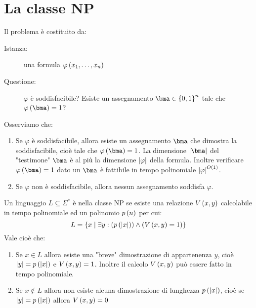 \documentclass{lectures}
\begin{document}
\chapter{La classe NP}
\begin{multicols}{2}
\begin{definition}[SODD]
    Il problema è costituito da:
    \begin{description}
        \item[Istanza:] una formula \(\varphi\left(x_1, \ldots, x_n\right)\)
        \item[Questione:] \(\varphi\) è soddisfacibile? Esiste un assegnamento \(\bma \in \crl{0,1}^n\) tale che \(\varphi\rnd{\bma} = 1\)?
    \end{description}
    Osserviamo che:
    \begin{enumerate}
        \item Se \(\varphi\) è soddisfacibile, allora esiste un assegnamento \(\bma\) che dimostra la soddisfacibile, cioè tale che \(\varphi\rnd{\bma} = 1\). La dimensione \(\abs{\bma}\) del "testimone" \(\bma\) è al più la dimensione \(\left\lvert\varphi\right\rvert\) della formula. Inoltre verificare \(\varphi\rnd{\bma} = 1\) dato un \(\bma\) è fattibile in tempo polinomiale \(\left\lvert\varphi\right\rvert^{O\left(1\right)}\).
        \item Se \(\varphi\) non è soddisfacibile, allora nessun assegnamento soddisfa \(\varphi\).
    \end{enumerate}
\end{definition}
\begin{definition}[Problema NP]
    Un linguaggio \(L\subseteq \Sigma^*\) è nella classe NP se esiste una relazione \(V\left(x,y\right)\) calcolabile in tempo polinomiale ed un polinomio \(p\left(n\right)\) per cui:
    \[
        L = \left\{x \mid \exists y: \left(p\left(\left\lvert x\right\rvert\right)\right) \land \left(V\left(x,y\right)=1\right)\right\}
    \]
    Vale cioè che:
    \begin{enumerate}
        \item Se \(x \in L\) allora esiste una "breve" dimostrazione di appartenenza \(y\), cioè \(\left\lvert y\right\rvert = p\left(\left\lvert x\right\rvert\right)\) e \(V\left(x,y\right) = 1\). Inoltre il calcolo \(V\left(x,y\right)\) può essere fatto in tempo polinomiale.
        \item Se \(x \not\in L\) allora non esiste alcuna dimostrazione di lunghezza \(p\left(\left\lvert x\right\rvert\right)\), cioè se \(\left\lvert y\right\rvert = p\left(\left\lvert x\right\rvert\right)\) allora \(V\left(x,y\right)=0\)
    \end{enumerate}
\end{definition}
\end{multicols}
\end{document}
